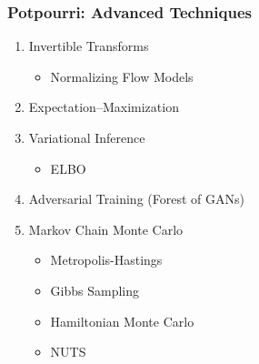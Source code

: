 \documentclass{beamer}
\begin{document}
\begin{frame}
  \frametitle{Potpourri: Advanced Techniques}
  \begin{enumerate}
    \item Invertible Transforms
      \begin{itemize}
        \item Normalizing Flow Models
      \end{itemize}
    \item Expectation–Maximization
    \item Variational Inference
      \begin{itemize}
        \item ELBO
      \end{itemize}
    \item Adversarial Training (Forest of GANs)
    \item Markov Chain Monte Carlo
    \begin{itemize}
      \item Metropolis-Hastings
      \item Gibbs Sampling
      \item Hamiltonian Monte Carlo
      \item NUTS
    \end{itemize}
  \end{enumerate}
\end{frame}
\end{document}
